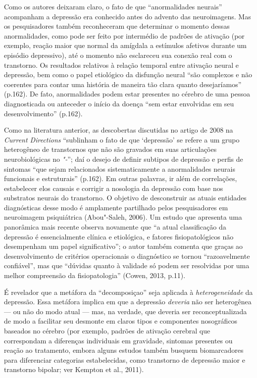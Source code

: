 Como os autores deixaram claro, o fato de que ``anormalidades neurais''
acompanham a depressão era conhecido antes do advento das neuroimagens.
Mas os pesquisadores também reconheceram que determinar o momento dessas
anormalidades, como pode ser feito por intermédio de padrões de ativação
(por exemplo, reação maior que normal da amígdala a estímulos afetivos
durante um episódio depressivo), até o momento não esclareceu sua
conexão real com o transtorno. Os resultados relativos à relação
temporal entre ativação neural e depressão, bem como o papel etiológico
da disfunção neural ``são complexos e não coerentes para contar uma
história de maneira tão clara quanto desejaríamos'' (p.162). De fato,
anormalidades podem estar presentes no cérebro de uma pessoa
diagnosticada ou anteceder o início da doença ``sem estar envolvidas em
seu desenvolvimento'' (p.162).

Como na literatura anterior, as descobertas discutidas no artigo de 2008
na \emph{Current Directions} ``sublinham o fato de que `depressão' se
refere a um grupo heterogêneo de transtornos que não são gravados em
suas articulações neurobiológicas no \emph{"-}''; daí o desejo de
definir subtipos de depressão e perfis de sintomas ``que sejam
relacionados sistematicamente a anormalidades neurais funcionais e
estruturais'' (p.162). Em outras palavras, ir além de correlações,
estabelecer elos causais e corrigir a nosologia da depressão com base
nos substratos neurais do transtorno. O objetivo de desconstruir as
atuais entidades diagnósticas desse modo é amplamente partilhado pelos
pesquisadores em neuroimagem psiquiátrica (Abou"-Saleh, 2006). Um estudo
que apresenta uma panorâmica mais recente observa novamente que ``a
atual classificação da depressão é essencialmente clínica e etiológica,
e fatores fisiopatológicos não desempenham um papel significativo''; o
autor também comenta que graças ao desenvolvimento de critérios
operacionais o diagnóstico se tornou ``razoavelmente confiável'', mas
que ``dúvidas quanto à validade só podem ser resolvidas por uma melhor
compreensão da fisiopatologia'' (Cowen, 2013, p.11).

É revelador que a metáfora da ``decomposiçao'' seja aplicada à
\emph{heterogeneidade} da depressão. Essa metáfora implica em que a
depressão \emph{deveria} não ser heterogênea --- ou não do modo atual
--- mas, na verdade, que deveria ser reconceptualizada de modo a
facilitar seu desmonte em claros tipos e componentes nosográficos
baseados no cérebro (por exemplo, padrões de ativação cerebral que
correspondam a diferenças individuais em gravidade, sintomas presentes
ou reação ao tratamento, embora alguns estudos também busquem
biomarcadores para diferenciar categorias estabelecidas, como transtorno
de depressão maior e transtorno bipolar; ver Kempton et al., 2011).


